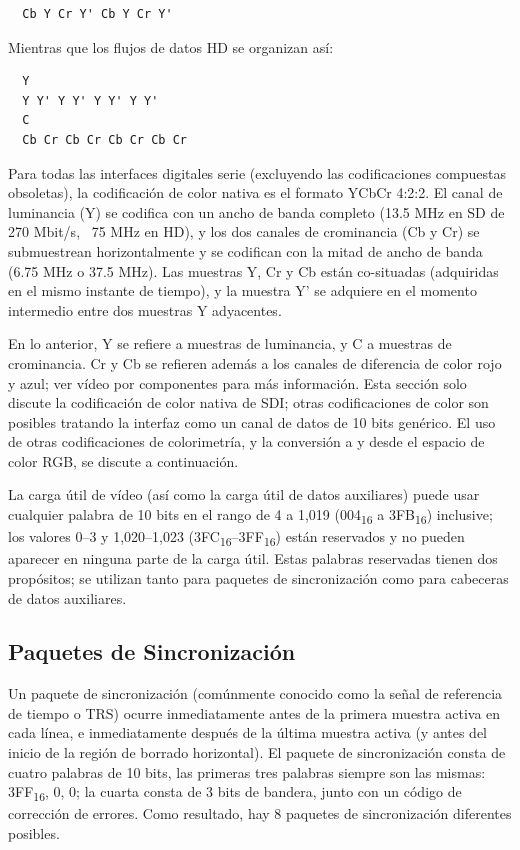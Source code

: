   \begin{verbatim}
  Cb Y Cr Y' Cb Y Cr Y'
  \end{verbatim}

  Mientras que los flujos de datos HD se organizan así:

  \begin{verbatim}
  Y
  Y Y' Y Y' Y Y' Y Y'
  C
  Cb Cr Cb Cr Cb Cr Cb Cr
  \end{verbatim}

  Para todas las interfaces digitales serie (excluyendo las codificaciones compuestas
  obsoletas), la codificación de color nativa es el formato YCbCr 4:2:2. El canal de
  luminancia (Y) se codifica con un ancho de banda completo (13.5 MHz en SD de 270 Mbit/s,
  ~75 MHz en HD), y los dos canales de crominancia (Cb y Cr) se submuestrean horizontalmente
  y se codifican con la mitad de ancho de banda (6.75 MHz o 37.5 MHz). Las muestras Y, Cr y
  Cb están co-situadas (adquiridas en el mismo instante de tiempo), y la muestra Y' se
  adquiere en el momento intermedio entre dos muestras Y adyacentes.

  En lo anterior, Y se refiere a muestras de luminancia, y C a muestras de crominancia. Cr y
  Cb se refieren además a los canales de diferencia de color rojo y azul; ver vídeo por
  componentes para más información. Esta sección solo discute la codificación de color nativa
  de SDI\@; otras codificaciones de color son posibles tratando la interfaz como un canal de
  datos de 10 bits genérico. El uso de otras codificaciones de colorimetría, y la conversión
  a y desde el espacio de color RGB, se discute a continuación.

  La carga útil de vídeo (así como la carga útil de datos auxiliares) puede usar cualquier
  palabra de 10 bits en el rango de 4 a 1,019 (004\textsubscript{16} a 3FB\textsubscript{16})
  inclusive; los valores 0–3 y 1,020–1,023 (3FC\textsubscript{16}–3FF\textsubscript{16}) están
  reservados y no pueden aparecer en ninguna parte de la carga útil. Estas palabras reservadas
  tienen dos propósitos; se utilizan tanto para paquetes de sincronización como para cabeceras
  de datos auxiliares.

  \subsection{Paquetes de Sincronización}

  Un paquete de sincronización (comúnmente conocido como la señal de referencia de tiempo o TRS)
  ocurre inmediatamente antes de la primera muestra activa en cada línea, e inmediatamente después
  de la última muestra activa (y antes del inicio de la región de borrado horizontal). El paquete
  de sincronización consta de cuatro palabras de 10 bits, las primeras tres palabras siempre son
  las mismas: 3FF\textsubscript{16}, 0, 0; la cuarta consta de 3 bits de bandera, junto con un código de corrección
  de errores. Como resultado, hay 8 paquetes de sincronización diferentes posibles.

